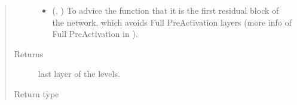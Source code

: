 \documentclass[letterpaper,10pt,english]{sphinxmanual}
\begin{document}
\begin{fulllineitems}
\begin{quote}
\begin{description}
\begin{itemize}
\item {} 
 (, ) \textendash{} To advice the function that it is the first residual block of the network, which avoids Full Pre\sphinxhyphen{}Activation
layers (more info of Full Pre\sphinxhyphen{}Activation in ).

\end{itemize}

\item[{Returns}] \leavevmode
{} \textendash{} last layer of the levels.

\item[{Return type}] \leavevmode
{}

\end{description}\end{quote}

\end{fulllineitems}

\end{document}
